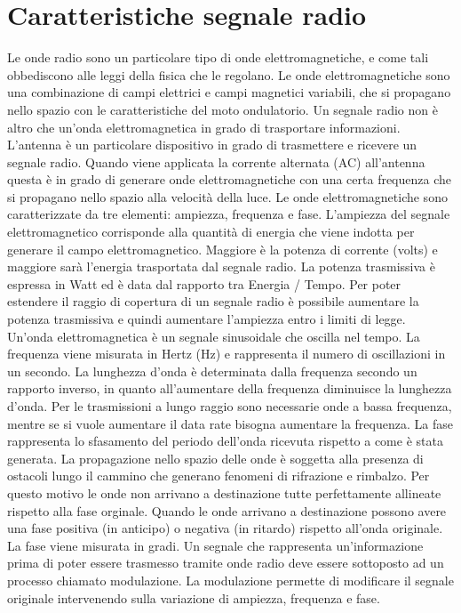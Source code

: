 \documentclass[12pt,a4paper,openright,twoside]{report}
\begin{document}
\section{Caratteristiche segnale radio}
Le onde radio sono un particolare tipo di onde elettromagnetiche, e come tali obbediscono alle leggi della fisica che le regolano. 
Le onde elettromagnetiche sono una combinazione di campi elettrici e campi magnetici variabili, che si propagano nello spazio con le caratteristiche del moto ondulatorio.  
Un segnale radio non \`e altro che un'onda elettromagnetica in grado di trasportare informazioni. L'antenna \`e un particolare dispositivo in grado di trasmettere e ricevere un segnale radio. Quando viene applicata la corrente alternata (AC) all'antenna questa \`e in grado di generare onde elettromagnetiche con una certa frequenza che si propagano nello spazio alla velocit\`a della luce.  
Le onde elettromagnetiche sono caratterizzate da tre elementi: ampiezza, frequenza e fase. 
L'ampiezza del segnale elettromagnetico corrisponde alla quantit\`a di energia che viene indotta per generare il campo elettromagnetico. Maggiore \`e la potenza di corrente (volts) e maggiore sar\`a l'energia trasportata dal segnale radio. 
La potenza trasmissiva \`e espressa in Watt ed \`e data dal rapporto tra Energia / Tempo. 
Per poter estendere il raggio di copertura di un segnale radio \`e possibile aumentare la potenza trasmissiva e quindi aumentare l'ampiezza entro i limiti di legge. 
Un'onda elettromagnetica \`e un segnale sinusoidale che oscilla nel tempo. La frequenza viene misurata in Hertz (Hz) e rappresenta il numero di oscillazioni in un secondo. 
La lunghezza d'onda \`e determinata dalla frequenza secondo un rapporto inverso, in quanto all'aumentare della frequenza diminuisce la lunghezza d'onda. Per le trasmissioni a lungo raggio sono necessarie onde a bassa frequenza, mentre se si vuole aumentare il data rate bisogna aumentare la frequenza.
La fase rappresenta lo sfasamento del periodo dell'onda ricevuta rispetto a come \`e stata generata. La propagazione nello spazio delle onde \`e soggetta alla presenza di ostacoli lungo il cammino che generano fenomeni di rifrazione e rimbalzo. Per questo motivo le onde non arrivano a destinazione tutte perfettamente allineate rispetto alla fase orginale. 
Quando le onde arrivano a destinazione possono avere una fase positiva (in anticipo) o negativa (in ritardo) rispetto all'onda originale. La fase viene misurata in gradi.
Un segnale che rappresenta un'informazione prima di poter essere trasmesso tramite onde radio deve essere sottoposto ad un processo chiamato modulazione. 
La modulazione permette di modificare il segnale originale intervenendo sulla variazione di ampiezza, frequenza e fase. 
\end{document}
